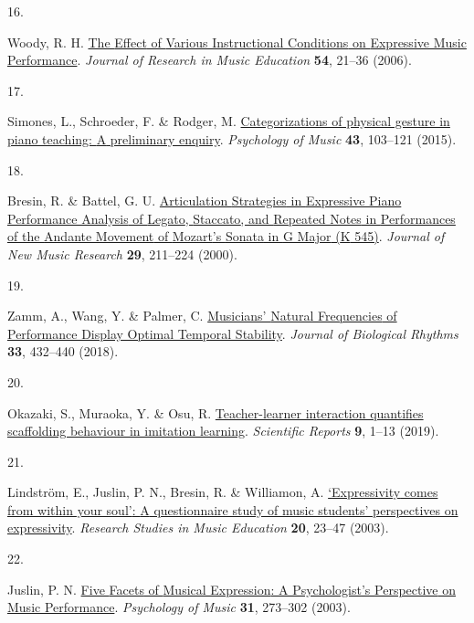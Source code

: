 \documentclass[
  man,floatsintext]{apa6}
\newlength{\cslhangindent}
\newlength{\csllabelwidth}
\newlength{\cslentryspacingunit} %
\newenvironment{CSLReferences}[2] %
 {%
  \setlength{\parindent}{0pt}
  \ifodd #1
  \let\oldpar\par
  \def\par{\hangindent=\cslhangindent\oldpar}
  \fi
  \setlength{\parskip}{#2\cslentryspacingunit}
 }%
 {}
\newcommand{\CSLLeftMargin}[1]{\parbox[t]{\csllabelwidth}{#1}}
\newcommand{\CSLRightInline}[1]{\parbox[t]{\linewidth - \csllabelwidth}{#1}\break}
\begin{document}
\begin{CSLReferences}{0}{0}
\leavevmode{}%
\CSLLeftMargin{16. }%
\CSLRightInline{Woody, R. H. \href{https://doi.org/10.1177/002242940605400103}{The {Effect} of {Various Instructional Conditions} on {Expressive Music Performance}}. \emph{Journal of Research in Music Education} \textbf{54}, 21--36 (2006).}

\leavevmode{}%
\CSLLeftMargin{17. }%
\CSLRightInline{Simones, L., Schroeder, F. \& Rodger, M. \href{https://doi.org/10.1177/0305735613498918}{Categorizations of physical gesture in piano teaching: {A} preliminary enquiry}. \emph{Psychology of Music} \textbf{43}, 103--121 (2015).}

\leavevmode{}%
\CSLLeftMargin{18. }%
\CSLRightInline{Bresin, R. \& Battel, G. U. \href{https://doi.org/10.1076/jnmr.29.3.211.3092}{Articulation {Strategies} in {Expressive Piano Performance Analysis} of {Legato}, {Staccato}, and {Repeated Notes} in {Performances} of the {Andante Movement} of {Mozart}'s {Sonata} in {G Major} ({K} 545)}. \emph{Journal of New Music Research} \textbf{29}, 211--224 (2000).}

\leavevmode{}%
\CSLLeftMargin{19. }%
\CSLRightInline{Zamm, A., Wang, Y. \& Palmer, C. \href{https://doi.org/10.1177/0748730418783651}{Musicians' {Natural Frequencies} of {Performance Display Optimal Temporal Stability}}. \emph{Journal of Biological Rhythms} \textbf{33}, 432--440 (2018).}

\leavevmode{}%
\CSLLeftMargin{20. }%
\CSLRightInline{Okazaki, S., Muraoka, Y. \& Osu, R. \href{https://doi.org/10.1038/s41598-019-44049-x}{Teacher-learner interaction quantifies scaffolding behaviour in imitation learning}. \emph{Scientific Reports} \textbf{9}, 1--13 (2019).}

\leavevmode{}%
\CSLLeftMargin{21. }%
\CSLRightInline{Lindström, E., Juslin, P. N., Bresin, R. \& Williamon, A. \href{https://doi.org/10.1177/1321103X030200010201}{{`{Expressivity} comes from within your soul'}: {A} questionnaire study of music students' perspectives on expressivity}. \emph{Research Studies in Music Education} \textbf{20}, 23--47 (2003).}

\leavevmode{}%
\CSLLeftMargin{22. }%
\CSLRightInline{Juslin, P. N. \href{https://doi.org/10.1177/03057356030313003}{Five {Facets} of {Musical Expression}: {A Psychologist}'s {Perspective} on {Music Performance}}. \emph{Psychology of Music} \textbf{31}, 273--302 (2003).}


\end{CSLReferences}
\end{document}
